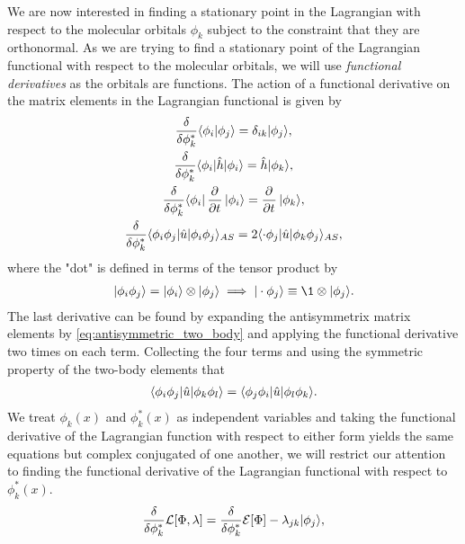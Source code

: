         We are now interested in finding a stationary point in the Lagrangian
        with respect to the molecular orbitals $\phi_k$ subject to the
        constraint that they are orthonormal.
        As we are trying to find a stationary point of the Lagrangian functional
        with respect to the molecular orbitals, we will use \emph{functional
        derivatives} as the orbitals are functions.
        The action of a functional derivative on the matrix elements in the
        Lagrangian functional is given by
        \begin{gather}
            \dfd{\phi_k^{*}}\braket{\phi_i}{\phi_j}
            = \delta_{ik}\ket{\phi_j}, \\
            \dfd{\phi_k^{*}}\bra{\phi_i}\hat{h}\ket{\phi_i}
            = \hat{h}\ket{\phi_k}, \\
            \dfd{\phi_k^{*}}\bra{\phi_i}\dpd{}{t}\ket{\phi_i}
            = \dpd{}{t}\ket{\phi_k}, \\
            \dfd{\phi_k^{*}}\bra{\phi_i\phi_j}\hat{u}\ket{\phi_i\phi_j}_{AS}
            = 2\bra{\cdot\phi_j}\hat{u}\ket{\phi_k\phi_j}_{AS},
        \end{gather}
        where the "dot" is defined in terms of the tensor product by
        \begin{align}
            \ket{\phi_i\phi_j} = \ket{\phi_i}\otimes\ket{\phi_j}
            \implies \ket{\cdot\phi_j} \equiv \1 \otimes\ket{\phi_j}.
        \end{align}
        The last derivative can be found by expanding the antisymmetrix matrix
        elements by \autoref{eq:antisymmetric_two_body} and applying the
        functional derivative two times on each term. Collecting the four terms
        and using the symmetric property of the two-body elements that
        \begin{align}
            \langle \phi_i\phi_j |\hat{u}| \phi_k\phi_l \rangle
            = \langle \phi_j\phi_i |\hat{u}| \phi_l\phi_k \rangle.
        \end{align}
        We treat $\phi_k(x)$ and $\phi_k^{*}(x)$ as independent
        variables and taking the functional derivative of the Lagrangian
        function with respect to either form yields the same equations but
        complex conjugated of one another, we will restrict our attention to
        finding the functional derivative of the Lagrangian functional with
        respect to $\phi_k^{*}(x)$.
        \begin{align}
            \frac{\delta }{\delta \phi_k^{*}}\mathcal{L}[\Phi, \lambda]
            = \frac{\delta }{\delta \phi_k^{*}}\mathcal{E}[\Phi]
            - \lambda_{jk}| \phi_{j} \rangle,
        \end{align}
